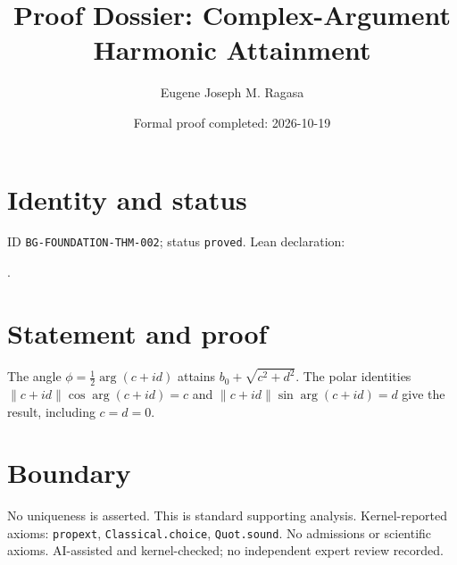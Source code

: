 \documentclass[11pt]{article}
\title{Proof Dossier: Complex-Argument Harmonic Attainment}\author{Eugene Joseph M. Ragasa}\date{Formal proof completed: 2026-10-19}
\begin{document}
\maketitle
\section{Identity and status}
ID \texttt{BG-FOUNDATION-THM-002}; status \texttt{proved}. Lean declaration:
\par{}.
\section{Statement and proof}
The angle $\phi=\tfrac12\arg(c+id)$ attains
$b_0+\sqrt{c^2+d^2}$. The polar identities
$\lVert c+id\rVert\cos\arg(c+id)=c$ and
$\lVert c+id\rVert\sin\arg(c+id)=d$ give the result, including $c=d=0$.
\section{Boundary}
No uniqueness is asserted. This is standard supporting analysis. Kernel-reported axioms:
\texttt{propext}, \texttt{Classical.choice}, \texttt{Quot.sound}. No admissions or
scientific axioms. AI-assisted and kernel-checked; no independent expert review recorded.
\end{document}
